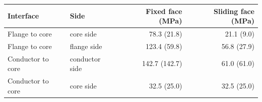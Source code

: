 \begin{tabular}{llrr}
\toprule
Interface & Side & Fixed face (MPa) & Sliding face (MPa) \\
\midrule
Flange to core & core side & 78.3 (21.8) & 21.1 (9.0) \\
Flange to core & flange side & 123.4 (59.8) & 56.8 (27.9) \\
Conductor to core & conductor side & 142.7 (142.7) & 61.0 (61.0) \\
Conductor to core & core side & 32.5 (25.0) & 32.5 (25.0) \\
\bottomrule
\end{tabular}
